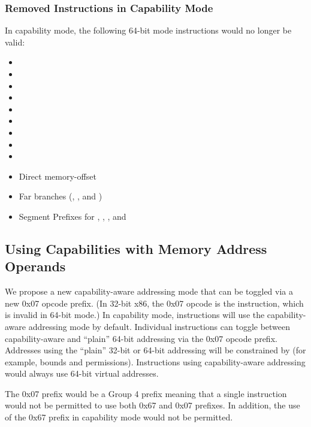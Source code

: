 \subsubsection{Removed Instructions in Capability Mode}

In capability mode, the following 64-bit mode instructions would no
longer be valid:

\begin{itemize}
  \item {}
  \item {}
  \item {}
  \item {}
  \item {}
  \item {}
  \item {}
  \item {}
  \item {}
  \item Direct memory-offset 
  \item Far branches (, , and )
  \item Segment Prefixes for \CS{}, \DS{}, \ES{}, and \SSreg{}
\end{itemize}

\subsection{Using Capabilities with Memory Address Operands}
\label{sec:x86:capability-addressing}

We propose a new capability-aware addressing mode that can be
toggled via a new 0x07
opcode prefix.  (In 32-bit x86, the 0x07 opcode is the
 instruction, which is invalid in 64-bit mode.)
In capability mode, instructions will use
the capability-aware addressing mode by default.  Individual
instructions can toggle between capability-aware and ``plain''
64-bit addressing via the 0x07 opcode prefix.  Addresses using the
``plain'' 32-bit or 64-bit addressing will be constrained by \DDC{}
(for example, bounds and permissions).
Instructions using capability-aware addressing
would always use 64-bit virtual addresses.

The 0x07 prefix would be a Group 4 prefix meaning that a single
instruction would not be permitted to use both 0x67 and 0x07 prefixes.
In addition, the use of the 0x67 prefix in capability mode would not
be permitted.


